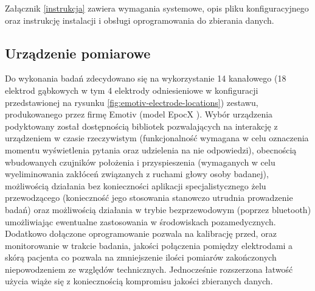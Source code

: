 \documentclass{./assets/wfis}
\begin{document}
Załącznik \ref{instrukcja} zawiera wymagania systemowe, opis pliku konfiguracyjnego oraz instrukcję instalacji i obsługi oprogramowania do zbierania danych.
\clearpage

\subsection{Urządzenie pomiarowe}\label{emotiv}
Do wykonania badań zdecydowano się na wykorzystanie 14 kanałowego (18 elektrod gąbkowych w tym 4 elektrody odniesieniowe w konfiguracji przedstawionej na rysunku \ref{fig:emotiv-electrode-locations}) zestawu, produkowanego przez firmę Emotiv (model EpocX \cite{emotiv_inc_epoc_nodate}). Wybór urządzenia podyktowany został dostępnością bibliotek pozwalających na interakcję z urządzeniem w czasie rzeczywistym \cite{emotiv_inc_emotiv_nodate-1} (funkcjonalność wymagana w celu oznaczenia momentu wyświetlenia pytania oraz udzielenia na nie odpowiedzi), obecnością wbudowanych czujników położenia i przyspieszenia (wymaganych w celu wyeliminowania zakłóceń związanych z ruchami głowy osoby badanej), możliwością działania bez konieczności aplikacji specjalistycznego żelu przewodzącego (konieczność jego stosowania stanowczo utrudnia prowadzenie badań) oraz możliwością działania w trybie bezprzewodowym (poprzez bluetooth) umożliwiając ewentualne zastosowania w środowiskach pozamedycznych. Dodatkowo dołączone oprogramowanie pozwala na kalibrację przed, oraz monitorowanie w trakcie badania, jakości połączenia pomiędzy elektrodami a skórą pacjenta co pozwala na zmniejszenie ilości pomiarów zakończonych niepowodzeniem ze względów technicznych. Jednocześnie rozszerzona łatwość użycia wiąże się z koniecznością kompromisu jakości zbieranych danych. 

\end{document}

